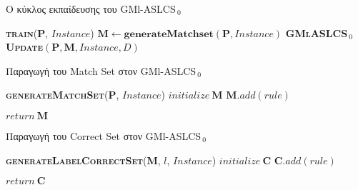 \begin{algorithm} 
 \caption{Ο κύκλος εκπαίδευσης του GMl-ASLCS$_{\:0}$}
\label{alg:gmlaslcs0Train}
 \begin{algorithmic}[1]
 	\STATE \textbf{\textsc{train}}($\textbf{P}$, $Instance$)
  	\STATE $\textbf{M} \gets \textbf{generateMatchset}(\textbf{P}, Instance)$
  	\STATE \textbf{\textsc{GMlASLCS$_{\:0}$Update}}$(\textbf{P}, \textbf{M}, Instance, D)$
 \end{algorithmic}
\end{algorithm}

\begin{algorithm} 
 \caption{Παραγωγή του Match Set στον GMl-ASLCS$_{\:0}$}
\label{alg:gmlaslcs0MatchSet}
 \begin{algorithmic}[1]
  	\STATE \textbf{\textsc{generateMatchSet}}($\textbf{P}$, $Instance$)
  	\STATE $initialize \: \textbf{M}$
  			\STATE $\textbf{M}.add(rule)$
  		\ENDIF	
  	\ENDFOR
  	
	\STATE $return \: \textbf{M}$
 \end{algorithmic}
\end{algorithm}


\begin{algorithm} 
 \caption{Παραγωγή του Correct Set στον GMl-ASLCS$_{\:0}$}
\label{alg:gmlaslcs0CorrectSet}
 \begin{algorithmic}[1]
  	\STATE \textbf{\textsc{generateLabelCorrectSet}}($\textbf{M}$, $l$, $Instance$)
  	\STATE $initialize \: \textbf{C}$
			\STATE $\textbf{C}.add(rule)$
		\ENDIF	
	\ENDFOR
  	
	\STATE $return \: \textbf{C}$
 \end{algorithmic}
\end{algorithm}



